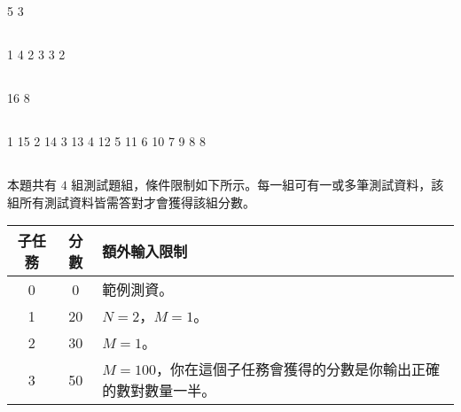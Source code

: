 \begin{tests}
5 3
\end{tests}

\subsection*{}

\begin{tests}
1 4
2 3
3 2
\end{tests}

\subsection*{}

\begin{tests}
16 8
\end{tests}

\subsection*{}

\begin{tests}
1 15
2 14
3 13
4 12
5 11
6 10
7 9
8 8
\end{tests}

\subsection*{}

本題共有 $4$ 組測試題組，條件限制如下所示。每一組可有一或多筆測試資料，該組所有測試資料皆需答對才會獲得該組分數。

\begin{center}
    \begin{tabular}[t]{@{}ccl@{}}
    \toprule
    子任務 & 分數 & 額外輸入限制\\
    \midrule
    0 & 0  & 範例測資。\\
    1 & 20 & $N=2$，$M=1$。\\
    2 & 30 & $M=1$。\\
    3 & 50 & $M=100$，你在這個子任務會獲得的分數是你輸出正確的數對數量一半。\\
    \bottomrule
    \end{tabular}
\end{center}


